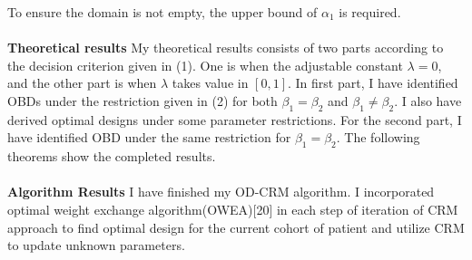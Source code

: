 \documentclass[12pt]{article}
\begin{document}
 To ensure the domain is not empty, the upper bound of $\alpha_1$ is required.\\
 \\
 \textbf{Theoretical results}
 My theoretical results consists of two parts according to the decision criterion given in (1). One is when the adjustable constant $\lambda=0$, and the other part is when $\lambda$ takes value in $[0,1]$. In first part, I have identified OBDs under the restriction given in (2) for both $\beta_1=\beta_2$ and $\beta_1 \neq \beta_2$. I also have derived optimal designs under some parameter restrictions. For the second part, I have identified OBD under the same restriction for $\beta_1=\beta_2$.  The following theorems show the completed results.\\
 \\
\textbf{Algorithm Results}
I have finished my OD-CRM algorithm. I incorporated optimal weight exchange algorithm(OWEA)[20] in each step of iteration of CRM approach to find optimal design for the current cohort of patient and utilize CRM to update unknown parameters. 
\end{document}
